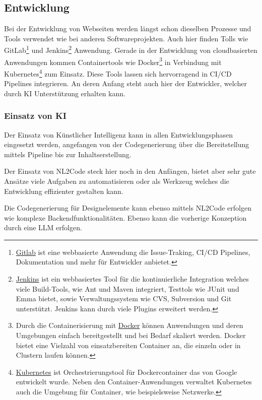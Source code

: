 \subsection{Entwicklung}
Bei der Entwicklung von Webseiten werden längst schon dieselben Prozesse und Tools verwendet wie bei anderen Softwareprojekten. Auch hier finden Tolls wie GitLab\footnote{\href{https://about.gitlab.com/}{Gitlab} ist eine webbasierte Anwendung die Issue-Traking, CI/CD Pipelines, Dokumentation und mehr für Entwickler anbietet.} und Jenkins\footnote{\href{https://www.jenkins.io/}{Jenkins} ist ein webbasiertes Tool für die kontinuierliche Integration welches viele Build-Tools, wie Ant und Maven integriert, Testtols wie JUnit und Emma bietet, sowie Verwaltungssystem wie CVS, Subversion und Git unterstützt. Jenkins kann durch viele Plugins erweitert werden.} Anwendung. Gerade in der Entwicklung von cloudbasierten Anwendungen kommen Containertools wie Docker\footnote{Durch die Containerisierung mit \href{https://www.docker.com/}{Docker} können Anwendungen und deren Umgebungen einfach bereitgestellt und bei Bedarf skaliert werden. Docker bietet eine Vielzahl von einsatzbereiten Container an, die einzeln oder in Clustern laufen können.} in Verbindung mit Kubernetes\footnote{\href{https://kubernetes.io/}{Kubernetes} ist  Orchestrierungstool für Dockercontainer das von Google entwickelt wurde. Neben den Container-Anwendungen verwaltet Kubernetes auch die Umgebung für Container, wie beispielsweise Netzwerke.} zum Einsatz. Diese Tools lassen sich hervorragend in CI/CD Pipelines integrieren. An deren Anfang steht auch hier der Entwickler, welcher durch KI Unterstützung erhalten kann.


\subsubsection{Einsatz von KI}
Der Einsatz von Künstlicher Intelligenz kann in allen Entwicklungsphasen eingesetzt werden, angefangen von der Codegenerierung über die Bereitstellung mittels Pipeline bis zur Inhaltserstellung.\vspace{0.2cm}

Der Einsatz von \acrshort{NL2Code} steck hier noch in den Anfängen, bietet aber sehr gute Ansätze viele Aufgaben zu automatisieren oder als Werkzeug welches die Entwicklung effizienter gestalten kann.\vspace{0.2cm}

Die Codegenerierung für Designelemente kann ebenso mittels NL2Code erfolgen wie komplexe Backendfunktionalitäten. Ebenso kann die vorherige Konzeption durch eine LLM erfolgen.

